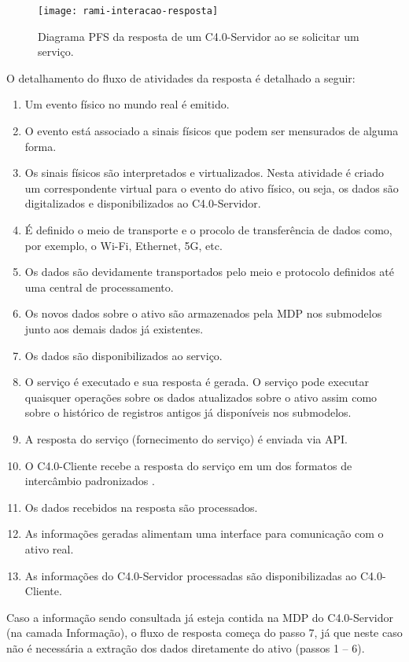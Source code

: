 \begin{figure}[htb]
	\centering
	\texttt{[image: rami-interacao-resposta]}
	\caption{Diagrama PFS da resposta de um C4.0-Servidor ao se solicitar um serviço.}
	\label{fig:rami-interacao-resposta}
\end{figure}

O detalhamento do fluxo de atividades da resposta é detalhado a seguir:

\begin{enumerate}

	\item Um evento físico no mundo real é emitido.

	\item O evento está associado a sinais físicos que podem ser mensurados de alguma forma.

	\item Os sinais físicos são interpretados e virtualizados. Nesta atividade é criado um correspondente virtual para o evento do ativo físico, ou seja, os dados são digitalizados e disponibilizados ao C4.0-Servidor.

	\item É definido o meio de transporte e o procolo de transferência de dados como, por exemplo, o Wi-Fi, Ethernet, 5G, etc.

	\item Os dados são devidamente transportados pelo meio e protocolo definidos até uma central de processamento.

	\item Os novos dados sobre o ativo são armazenados pela MDP nos submodelos junto aos demais dados já existentes.

	\item Os dados são disponibilizados ao serviço.

	\item O serviço é executado e sua resposta é gerada. O serviço pode executar quaisquer operações sobre os dados atualizados sobre o ativo assim como sobre o histórico de registros antigos já disponíveis nos submodelos.

	\item A resposta do serviço (fornecimento do serviço) é enviada via API.

	\item O C4.0-Cliente recebe a resposta do serviço em um dos formatos de intercâmbio padronizados \cite{bader2019aas}.

	\item Os dados recebidos na resposta são processados.

	\item As informações geradas alimentam uma interface para comunicação com o ativo real.

	\item As informações do C4.0-Servidor processadas são disponibilizadas ao C4.0-Cliente.
\end{enumerate}

Caso a informação sendo consultada já esteja contida na MDP do C4.0-Servidor (na camada Informação), o fluxo de resposta começa do passo 7, já que neste caso não é necessária a extração dos dados diretamente do ativo (passos 1 -- 6).
